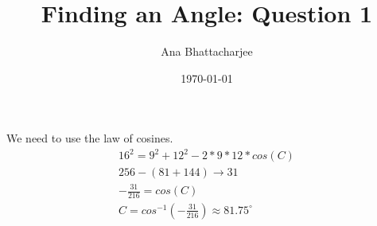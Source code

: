 \documentclass{article}
\begin{document}
\title{Finding an Angle: Question 1}
\author{Ana Bhattacharjee}
\date{\today}
\maketitle{}

\begin{center}
We need to use the law of cosines.
\begin{align}
16^2 = 9^2 + 12^2 - 2*9*12*cos(C) \\
256 - (81 + 144) \rightarrow 31 \\
-\frac{31}{216} = cos(C) \\
C = cos^{-1}(-\frac{31}{216}) \approx 81.75^{\circ}
\end{align}
\end{center}
\end{document}
